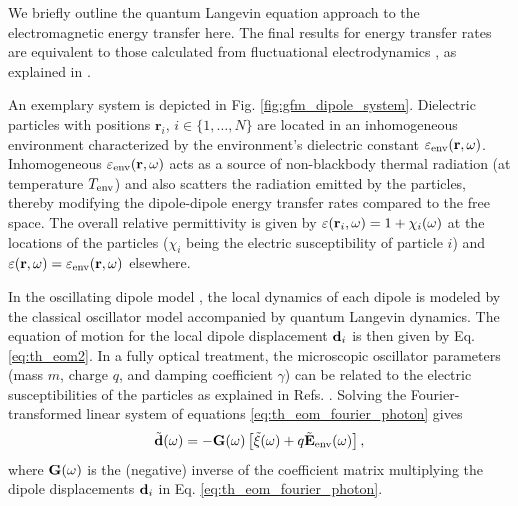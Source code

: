 We briefly outline the quantum Langevin equation approach to the electromagnetic energy transfer here. The final results for energy transfer rates are equivalent to those calculated from fluctuational electrodynamics \cite{benabdallah11,messina13}, as explained in . 

An exemplary system is depicted in Fig. \ref{fig:gfm_dipole_system}. Dielectric particles with positions $\mathbf{r}_i$, $i\in\{1,\dots,N\}$ are located in an inhomogeneous environment characterized by the environment's dielectric constant $\varepsilon_{\textrm{env}}(\mathbf{r},\omega)$. Inhomogeneous $\varepsilon_{\textrm{env}}(\mathbf{r},\omega)$ acts as a source of non-blackbody thermal radiation (at temperature $T_{\textrm{env}}$) and also scatters the radiation emitted by the particles, thereby modifying the dipole-dipole energy transfer rates compared to the free space. The overall relative permittivity is given by $\varepsilon(\mathbf{r}_i,\omega)=1+\chi_i(\omega)$ at the locations of the particles ($\chi_i$ being the electric susceptibility of particle $i$) and $\varepsilon(\mathbf{r},\omega)=\varepsilon_{\textrm{env}}(\mathbf{r},\omega)$ elsewhere. 


In the oscillating dipole model \cite{rosa10,rosa11}, the local dynamics of each dipole is modeled by the classical oscillator model accompanied by quantum Langevin dynamics. The equation of motion for the local dipole displacement $\mathbf{d}_i$ is then given by Eq. \eqref{eq:th_eom2}. In a fully optical treatment, the microscopic oscillator parameters (mass $m$, charge $q$, and damping coefficient $\gamma$) can be related to the electric susceptibilities of the particles as explained in Refs. \cite{rosa10,rosa11}. Solving the Fourier-transformed linear system of equations \eqref{eq:th_eom_fourier_photon} gives
\begin{equation}
 \tilde{\mathbf{d}}(\omega) = -\mathbf{G}(\omega) \left[\tilde{\xi}(\omega)+q\tilde{\mathbf{E}}_{\textrm{env}}(\omega) \right], \label{eq:th_bd_sol}
\end{equation}
where $\mathbf{G}(\omega)$ is the (negative) inverse of the coefficient matrix multiplying the dipole displacements $\mathbf{d}_i$ in Eq. \eqref{eq:th_eom_fourier_photon}.

